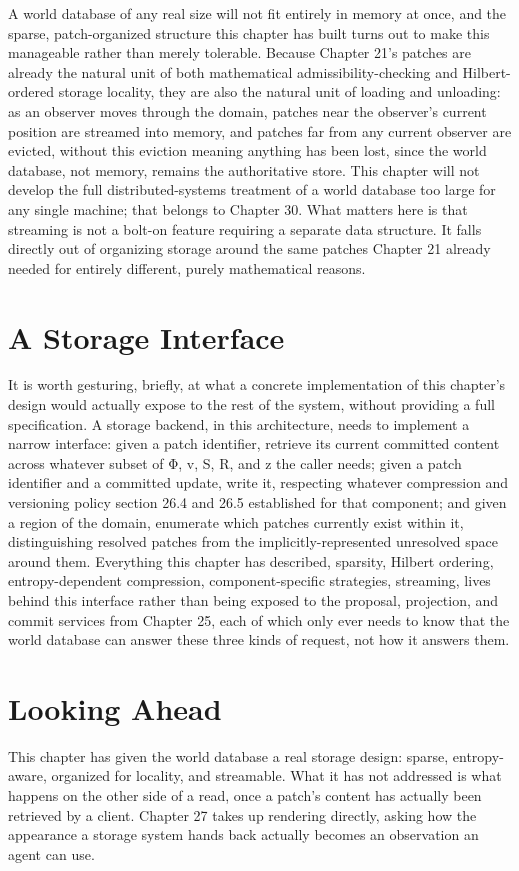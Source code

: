 A world database of any real size will not fit entirely in memory at once, and the sparse, patch-organized structure this chapter has built turns out to make this manageable rather than merely tolerable. Because Chapter 21's patches are already the natural unit of both mathematical admissibility-checking and Hilbert-ordered storage locality, they are also the natural unit of loading and unloading: as an observer moves through the domain, patches near the observer's current position are streamed into memory, and patches far from any current observer are evicted, without this eviction meaning anything has been lost, since the world database, not memory, remains the authoritative store. This chapter will not develop the full distributed-systems treatment of a world database too large for any single machine; that belongs to Chapter 30. What matters here is that streaming is not a bolt-on feature requiring a separate data structure. It falls directly out of organizing storage around the same patches Chapter 21 already needed for entirely different, purely mathematical reasons.

\section{A Storage Interface}

It is worth gesturing, briefly, at what a concrete implementation of this chapter's design would actually expose to the rest of the system, without providing a full specification. A storage backend, in this architecture, needs to implement a narrow interface: given a patch identifier, retrieve its current committed content across whatever subset of Φ, v, S, R, and z the caller needs; given a patch identifier and a committed update, write it, respecting whatever compression and versioning policy section 26.4 and 26.5 established for that component; and given a region of the domain, enumerate which patches currently exist within it, distinguishing resolved patches from the implicitly-represented unresolved space around them. Everything this chapter has described, sparsity, Hilbert ordering, entropy-dependent compression, component-specific strategies, streaming, lives behind this interface rather than being exposed to the proposal, projection, and commit services from Chapter 25, each of which only ever needs to know that the world database can answer these three kinds of request, not how it answers them.

\section{Looking Ahead}

This chapter has given the world database a real storage design: sparse, entropy-aware, organized for locality, and streamable. What it has not addressed is what happens on the other side of a read, once a patch's content has actually been retrieved by a client. Chapter 27 takes up rendering directly, asking how the appearance a storage system hands back actually becomes an observation an agent can use.
